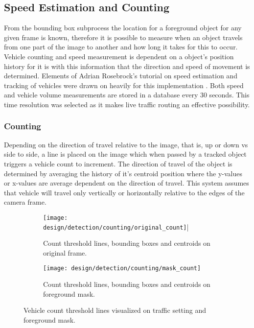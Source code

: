\subsection{Speed Estimation and Counting}
\label{subsection:count_measure}
From the bounding box subprocess the location for a foreground object for any given frame is known, therefore it is possible to measure when an object travels from one part of the image to another and how long it takes for this to occur. Vehicle counting and speed measurement is dependent on a object's position history for it is with this information that the direction and speed of movement is determined. Elements of Adrian Rosebrock's tutorial on speed estimation and tracking of vehicles were drawn on heavily for this implementation \cite{adrian_rosebrock_vehicle_tracking}. Both speed and vehicle volume measurements are stored in a database every 30 seconds. This time resolution was selected as it makes live traffic routing an effective possibility. 

\subsubsection{Counting}

Depending on the direction of travel relative to the image, that is, up or down vs side to side, a line is placed on the image which when passed by a tracked object triggers a vehicle count to increment. The direction of travel of the object is determined by averaging the history of it's centroid position where the y-values or x-values are average dependent on the direction of travel. This system assumes that vehicle will travel only vertically or horizontally relative to the edges of the camera frame.  

\begin{figure}[H]
	\centering
	\begin{subfigure}[b]{0.42\textwidth}
            \centering\texttt{[image: design/detection/counting/original\_count]}|
            \captionsetup{format = hang}  
      		\caption{Count threshold lines, bounding boxes and centroids on original frame.}
    	\end{subfigure}
    	\begin{subfigure}[b]{0.42\textwidth}
      		\centering\texttt{[image: design/detection/counting/mask\_count]}
            \captionsetup{format = hang}    
            \caption{Count threshold lines, bounding boxes and centroids on foreground mask.}
        \end{subfigure}
        \captionsetup{format = hang}
    	\caption{Vehicle count threshold lines visualized on traffic setting and foreground mask.}
    	\label{fig:count_lines}
\end{figure}

